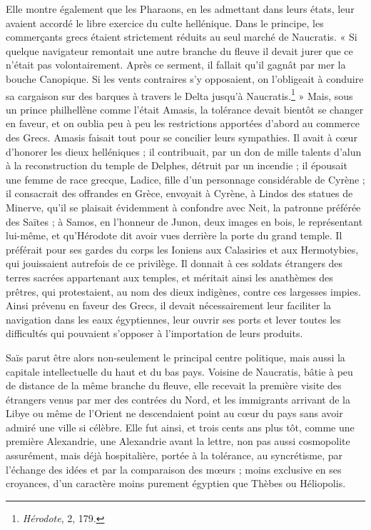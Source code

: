 \documentclass[a4paper, 11pt, oneside]{article}
\begin{document}
Elle montre également que les Pharaons, en les admettant dans leurs états, leur avaient accordé le libre exercice du culte hellénique. Dans le principe, les commerçants grecs étaient strictement réduits au seul marché de Naucratis. « Si quelque navigateur remontait une autre branche du fleuve il devait jurer que ce n'était pas volontairement. Après ce serment, il fallait qu'il gagnât par mer la bouche Canopique. Si les vents contraires s'y opposaient, on l'obligeait à conduire sa cargaison sur des barques à travers le Delta jusqu'à Naucratis.\footnote{\emph{Hérodote}, 2, 179.} » Mais, sous un prince philhellène comme l'était Amasis, la tolérance devait bientôt se changer en faveur, et on oublia peu à peu les restrictions apportées d'abord au commerce des Grecs. Amasis faisait tout pour se concilier leurs sympathies. Il avait à cœur d'honorer les dieux helléniques ; il contribuait, par un don de mille talents d'alun à la reconstruction du temple de Delphes, détruit par un incendie ; il épousait une femme de race grecque, Ladice, fille d'un personnage considérable de Cyrène ; il consacrait des offrandes en Grèce, envoyait à Cyrène, à Lindos des statues de Minerve, qu'il se plaisait évidemment à confondre avec Neit, la patronne préférée des Saïtes ; à Samos, en l'honneur de Junon, deux images en bois, le représentant lui-même, et qu'Hérodote dit avoir vues derrière la porte du grand temple. Il préférait pour ses gardes du corps les Ioniens aux Calasiries et aux Hermotybies, qui jouissaient autrefois de ce privilège. Il donnait à ces soldats étrangers des terres sacrées appartenant aux temples, et méritait ainsi les anathèmes des prêtres, qui protestaient, au nom des dieux indigènes, contre ces largesses impies. Ainsi prévenu en faveur des Grecs, il devait nécessairement leur faciliter la navigation dans les eaux égyptiennes, leur ouvrir ses ports et lever toutes les difficultés qui pouvaient s'opposer à l'importation de leurs produits.

Saïs parut être alors non-seulement le principal centre politique, mais aussi la capitale intellectuelle du haut et du bas pays. Voisine de Naucratis, bâtie à peu de distance de la même branche du fleuve, elle recevait la première visite des étrangers venus par mer des contrées du Nord, et les immigrants arrivant de la Libye ou même de l'Orient ne descendaient point au cœur du pays sans avoir admiré une ville si célèbre. Elle fut ainsi, et trois cents ans plus tôt, comme une première Alexandrie, une Alexandrie avant la lettre, non pas aussi cosmopolite assurément, mais déjà hospitalière, portée à la tolérance, au syncrétisme, par l'échange des idées et par la comparaison des mœurs ; moins exclusive en ses croyances, d'un caractère moins purement égyptien que Thèbes ou Héliopolis.
\end{document}
